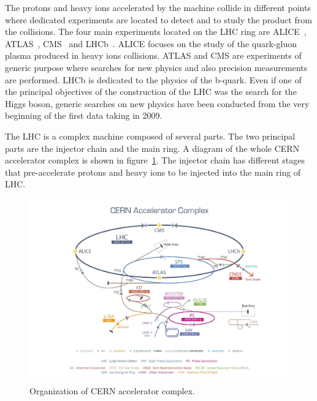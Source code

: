 The protons and heavy ions accelerated by the machine collide in different points where dedicated experiments are located to detect and to study the product from the collisions. The four main experiments located on the LHC ring are ALICE~\cite{Cortese:879894}, ATLAS~\cite{ATLAS:1999}, CMS~\cite{Bayatian:922757} and LHCb~\cite{Alves:2008zz}. ALICE focuses on the study of the quark-gluon plasma produced in heavy ions collisions. ATLAS and CMS are experiments of generic purpose where searches for new physics and also precision measurements are performed. LHCb is dedicated to the physics of the b-quark. Even if one of the principal objectives of the construction of the LHC was the search for the Higgs boson, generic searches on new physics have been conducted from the very beginning of the first data taking in 2009. %

The LHC is a complex machine composed of several parts. The two principal parts are the injector chain and the main ring. A diagram of the whole CERN accelerator complex is shown in figure~\ref{fig:Complex}. The injector chain has different stages that pre-accelerate protons and heavy ions to be injected into the main ring of LHC. %

\begin{figure}[!Hhtbp]
  \begin{center}
    \includegraphics[trim=4.5cm 0cm 0cm 0cm, clip=true, width=1.15\textwidth]{figs/cern-lhc-4.jpg}
    \caption{Organization of CERN accelerator complex.}
    \label{fig:Complex}
  \end{center}
\end{figure}

